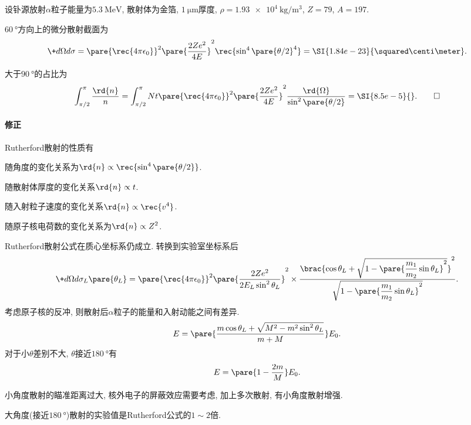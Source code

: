 \documentclass[hidelinks]{ctexart}
\begin{document}
\begin{sample}
    \begin{ex}
        设钋源放射$\alpha$粒子能量为$\SI{5.3}{\mega\eV}$, 散射体为金箔, $\SI{1}{\micro\meter}$厚度, $\rho = \SI{1.93e4}{\kilo\gram\per\cubic\meter}$, $Z=79$, $A=197$.
    \end{ex}
    \begin{solution}
        $\SI{60}{\degree}$方向上的微分散射截面为
        \[ \+d{\Omega}d{\sigma} = \pare{\rec{4\pi\epsilon_0}}^2 \pare{\frac{2Ze^2}{4E}}^2 \rec{\sin^4\pare{\theta/2}^4} = \SI{1.84e-23}{\squared\centi\meter}. \]
        \par
        大于$\SI{90}{\degree}$的占比为
        \[ \int_{\pi/2}^{\pi} \frac{\rd{n}}{n} = \int_{\pi/2}^{\pi} Nt\pare{\rec{4\pi\epsilon_0}}^2\pare{\frac{2Ze^2}{4E}}^2 \frac{\rd{\Omega}}{\sin^2\pare{\theta/2}} = \SI{8.5e-5}{}. \qedhere \]
    \end{solution}
\end{sample}

\paragraph{修正} %
\label{par:修正}

Rutherford散射的性质有
\begin{cenum}
    \item 随角度的变化关系为$\displaystyle \rd{n}\propto \rec{\sin^4\pare{\theta/2}}$.
    \item 随散射体厚度的变化关系$\displaystyle \rd{n}\propto t$.
    \item 随入射粒子速度的变化关系$\displaystyle \rd{n}\propto \rec{v^4}$.
    \item 随原子核电荷数的变化关系为$\displaystyle \rd{n}\propto Z^2$.
\end{cenum}
Rutherford散射公式在质心坐标系仍成立. 转换到实验室坐标系后
\[ \+d{\Omega}d{\sigma_L\pare{\theta_L}} = \pare{\rec{4\pi\epsilon_0}}^2 \pare{\frac{2Ze^2}{\displaystyle 2E_L \sin^2 {\theta_L}}}^2\times \frac{\displaystyle \brac{\cos\theta_L + \sqrt{1-\pare{\frac{m_1}{m_2}\sin\theta_L}^2}}^2}{\displaystyle \sqrt{1-\pare{\frac{m_1}{m_2}\sin\theta_L}^2}}. \]
考虑原子核的反冲, 则散射后$\alpha$粒子的能量和入射动能之间有差异.
\[ E = \pare{\frac{m\cos\theta_L + \sqrt{M^2 - m^2\sin^2\theta_L}}{m+M}}E_0. \]
对于小$\theta$差别不大, $\theta$接近$\SI{180}{\degree}$有
\[ E = \pare{1-\frac{2m}{M}}E_0. \]
\begin{remark}
    小角度散射的瞄准距离过大, 核外电子的屏蔽效应需要考虑, 加上多次散射, 有小角度散射增强.
\end{remark}
\begin{remark}
    大角度(接近$\SI{180}{\degree}$)散射的实验值是Rutherford公式的$1\sim 2$倍.
\end{remark}
\end{document}
